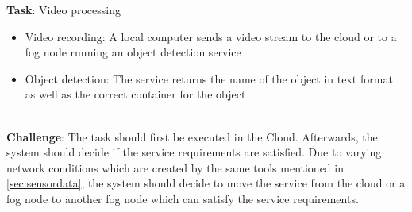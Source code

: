 \textbf{Task}: Video processing
\begin{itemize}
    \item Video recording: A local computer sends a video stream to the cloud or to a fog node running an object detection service
    \item Object detection: The service returns the name of the object in text format as well as the correct container for the object
\end{itemize}
\\
\textbf{Challenge}: The task should first be executed in the Cloud. Afterwards, the system should decide if the service requirements are satisfied. Due to varying network conditions which are created by the same tools mentioned in \ref{sec:sensordata}, the system should decide to move the service from the cloud or a fog node to another fog node which can satisfy the service requirements.